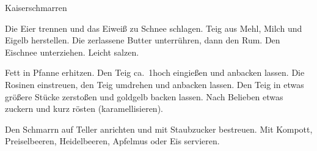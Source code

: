 \begin{recipe}{Kaiserschmarren}
%
%
%
%

\begin{ingredients}
\end{ingredients}

\begin{instructions}
    Die Eier trennen und das Eiweiß zu Schnee schlagen.
    Teig aus Mehl, Milch und Eigelb herstellen.
    Die zerlassene Butter unterrühren, dann den Rum.
    Den Eischnee unterziehen.
    Leicht salzen.

    Fett in Pfanne erhitzen.
    Den Teig ca.\ 1\cm hoch eingießen und anbacken lassen.
    Die Rosinen einstreuen, den Teig umdrehen und anbacken lassen.
    Den Teig in etwas größere Stücke zerstoßen und goldgelb backen lassen.
    Nach Belieben etwas zuckern und kurz rösten (karamellisieren).

    Den Schmarrn auf Teller anrichten und mit Staubzucker bestreuen.
    Mit Kompott, Preiselbeeren, Heidelbeeren, Apfelmus oder Eis servieren.
\end{instructions}
\end{recipe}
